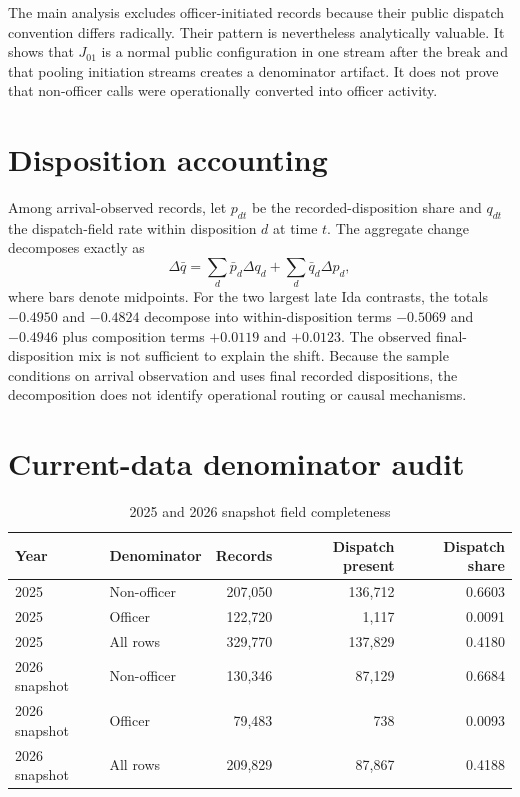 \documentclass[11pt]{article}
\begin{document}
The main analysis excludes officer-initiated records because their public dispatch convention differs radically. Their pattern is nevertheless analytically valuable. It shows that $J_{01}$ is a normal public configuration in one stream after the break and that pooling initiation streams creates a denominator artifact. It does not prove that non-officer calls were operationally converted into officer activity.

\section{Disposition accounting}

Among arrival-observed records, let $p_{dt}$ be the recorded-disposition share and $q_{dt}$ the dispatch-field rate within disposition $d$ at time $t$. The aggregate change decomposes exactly as
\begin{equation}
\Delta \bar q
=\sum_d \bar p_d\Delta q_d+\sum_d \bar q_d\Delta p_d,
\end{equation}
where bars denote midpoints. For the two largest late Ida contrasts, the totals $-0.4950$ and $-0.4824$ decompose into within-disposition terms $-0.5069$ and $-0.4946$ plus composition terms $+0.0119$ and $+0.0123$. The observed final-disposition mix is not sufficient to explain the shift. Because the sample conditions on arrival observation and uses final recorded dispositions, the decomposition does not identify operational routing or causal mechanisms.

\section{Current-data denominator audit}

\begin{table}[t]
\centering
\caption{2025 and 2026 snapshot field completeness}
\label{tab:currentsupp}
\begin{tabular}{@{}llrrr@{}}
\toprule
Year & Denominator & Records & Dispatch present & Dispatch share \\
\midrule
2025 & Non-officer & 207,050 & 136,712 & 0.6603 \\
2025 & Officer & 122,720 & 1,117 & 0.0091 \\
2025 & All rows & 329,770 & 137,829 & 0.4180 \\
2026 snapshot & Non-officer & 130,346 & 87,129 & 0.6684 \\
2026 snapshot & Officer & 79,483 & 738 & 0.0093 \\
2026 snapshot & All rows & 209,829 & 87,867 & 0.4188 \\
\bottomrule
\end{tabular}
\end{table}
\end{document}
